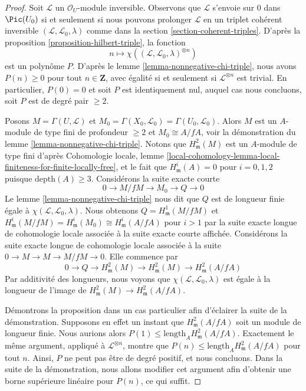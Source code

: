 \begin{proof}
Soit $\mathcal{L}$ un $\mathcal{O}_U$-module inversible.
Observons que $\mathcal{L}$ s'envoie sur $0$ dans $\Pic(U_0)$
si et seulement si nous pouvons prolonger $\mathcal{L}$ en un triplet cohérent
inversible $(\mathcal{L}, \mathcal{L}_0, \lambda)$
comme dans la section \ref{section-coherent-triples}.
D'après la proposition \ref{proposition-hilbert-triple},
la fonction
$$
n \longmapsto \chi((\mathcal{L}, \mathcal{L}_0, \lambda)^{\otimes n})
$$
est un polynôme $P$. D'après le lemme \ref{lemma-nonnegative-chi-triple},
nous avons
$P(n) \geq 0$ pour tout $n \in \mathbf{Z}$, avec égalité si et seulement si
$\mathcal{L}^{\otimes n}$ est trivial. En particulier, $P(0) = 0$
et soit $P$ est identiquement nul, auquel cas nous concluons, soit $P$ est de degré pair $\geq 2$.

\medskip\noindent
Posons $M = \Gamma(U, \mathcal{L})$ et
$M_0 = \Gamma(X_0, \mathcal{L}_0) = \Gamma(U_0, \mathcal{L}_0)$.
Alors $M$ est un $A$-module de type fini de profondeur $\geq 2$
et $M_0 \cong A/fA$, voir la démonstration du lemme \ref{lemma-nonnegative-chi-triple}.
Notons que $H^2_\mathfrak m(M)$ est un $A$-module de type fini d'après
Cohomologie locale, lemme
\ref{local-cohomology-lemma-local-finiteness-for-finite-locally-free},
et le fait que $H^i_\mathfrak m(A) = 0$ pour $i = 0, 1, 2$
puisque $\text{depth}(A) \geq 3$.
Considérons la suite exacte courte
$$
0 \to M/fM \to M_0 \to Q \to 0
$$
Le lemme \ref{lemma-nonnegative-chi-triple} nous dit que $Q$ est de longueur finie
égale à $\chi(\mathcal{L}, \mathcal{L}_0, \lambda)$.
Nous obtenons $Q = H^1_\mathfrak m(M/fM)$ et
$H^i_\mathfrak m(M/fM) = H^i_\mathfrak m(M_0) \cong H^i_\mathfrak m(A/fA)$
pour $i > 1$ par la suite exacte longue de cohomologie locale
associée à la suite exacte courte affichée. Considérons la suite
exacte longue de cohomologie locale associée à la suite
$0 \to M \to M \to M/fM \to 0$. Elle commence par
$$
0 \to Q \to H^2_\mathfrak m(M) \to H^2_\mathfrak m(M) \to
H^2_\mathfrak m(A/fA)
$$
Par additivité des longueurs, nous voyons que
$\chi(\mathcal{L}, \mathcal{L}_0, \lambda)$
est égale à la longueur de l'image de
$H^2_\mathfrak m(M) \to H^2_\mathfrak m(A/fA)$.

\medskip\noindent
Démontrons la proposition dans un cas particulier afin d'éclairer la suite de la démonstration.
Supposons en effet un instant que $H^2_\mathfrak m(A/fA)$ soit
un module de longueur finie. Nous aurions alors
$P(1) \leq \text{length}_A H^2_\mathfrak m(A/fA)$.
Exactement le même argument, appliqué à $\mathcal{L}^{\otimes n}$, montre que
$P(n) \leq \text{length}_A H^2_\mathfrak m(A/fA)$ pour tout $n$.
Ainsi, $P$ ne peut pas être de degré positif, et nous concluons.
Dans la suite de la démonstration, nous allons modifier cet argument afin d'obtenir
une borne supérieure linéaire pour $P(n)$, ce qui suffit.


\end{proof}
